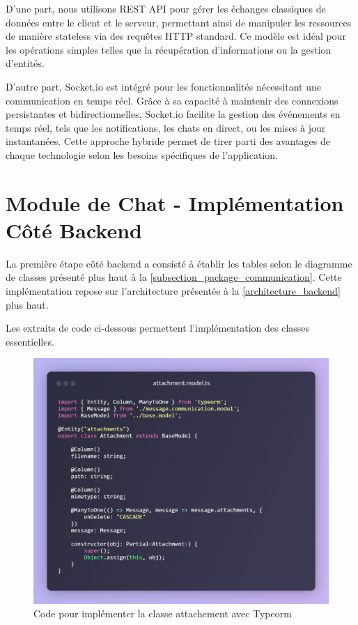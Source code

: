 \vspace{0.35cm}

D'une part, nous utilisons REST API pour gérer les échanges classiques de données entre le client et le serveur, permettant ainsi de manipuler les ressources de manière stateless via des requêtes HTTP standard. Ce modèle est idéal pour les opérations simples telles que la récupération d'informations ou la gestion d'entités.

\vspace{0.35cm}

D'autre part, Socket.io est intégré pour les fonctionnalités nécessitant une communication en temps réel. Grâce à sa capacité à maintenir des connexions persistantes et bidirectionnelles, Socket.io facilite la gestion des événements en temps réel, tels que les notifications, les chats en direct, ou les mises à jour instantanées. Cette approche hybride permet de tirer parti des avantages de chaque technologie selon les besoins spécifiques de l'application.

\clearpage

\section{Module de Chat - Implémentation Côté Backend}

La première étape côté backend a consisté à établir les tables selon le diagramme de classes présenté plus haut à la \autoref{subsection_package_communication}. Cette implémentation repose sur l'architecture présentée à la \autoref{architecture_backend} plus haut.

Les extraits de code ci-dessous permettent l'implémentation des classes essentielles.


\begin{figure}[H]
    \centering
    \includegraphics[width=16cm]{assets/annexes/snippet.png}
    \caption{Code pour implémenter la classe attachement avec Typeorm}
\end{figure}

